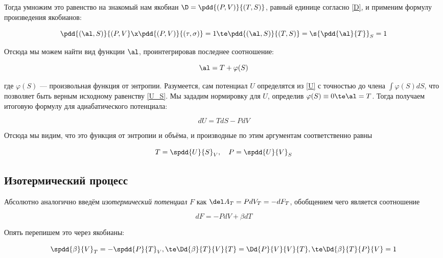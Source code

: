 \documentclass[12pt]{kiarticle}
\begin{document}
Тогда умножим это равенство на знакомый нам якобиан $ \D  = \pdd{(P, V)}{(T, S)} $, равный единице согласно \eqref{D}, и применим формулу произведения якобианов:

\begin{equation}\label{}
\pdd{(\al, S)}{(P, V} \x  \pdd{(P, V)}{(\tau, \sigma)} = 1 \te \pdd{(\al, S)}{(T, S)} = \s{\pdd{\al}{T}}_S = 1
\end{equation}

Отсюда мы можем найти вид функции $ \al $, проинтегрировав последнее соотношение:

\begin{equation}\label{}
\al = T + \varphi(S)
\end{equation}

где $ \varphi(S) $ --- произвольная функция от энтропии. Разумеется, сам потенциал $ U $ определятся из \eqref{U} с точностью до члена $ \int \varphi(S)dS $, что позволяет быть верным исходному равенству \eqref{U_S}. Мы зададим нормировку для $ U $, определив $ \varphi(S) \equiv 0 \te \al = T $. Тогда получаем итоговую формулу для адиабатического потенциала:

\begin{equation}\label{U =}
dU = TdS - PdV
\end{equation}

Отсюда мы видим, что это функция от энтропии и объёма, и производные по этим аргументам соответственно равны 

\begin{equation}\label{}
T = \spdd{U}{S}_V, \quad P = \spdd{U}{V}_S
\end{equation}

\subsection{Изотермический процесс}

Абсолютно аналогично введём \textit{изотермический потенциал} $ F $ как $ \del A_T = P dV_T = - dF_T $, обобщением чего является соотношение

\begin{equation}\label{F}
dF = -PdV + \beta dT
\end{equation}

Опять перепишем это через якобианы: 

\begin{equation}\label{}
\spdd{\beta}{V}_T = - \spdd{P}{T}_V , \te \Dd{\beta}{T}{V}{T} = \Dd{P}{V}{V}{T} ,  \te \Dd{\beta}{T}{P}{V} = 1
\end{equation}
\end{document}
